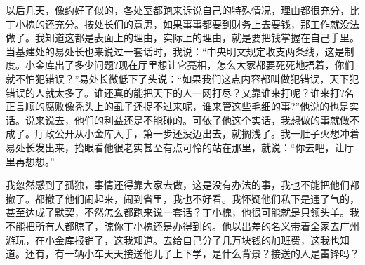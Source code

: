 \documentclass[12pt,oneside]{book}
\begin{document}
以后几天，像约好了似的，各处室都跑来诉说自己的特殊情况，理由都很充分，比丁小槐的还充分。按处长们的意思，如果事事都要到财务上去要钱，那工作就没法做了。我知道这都是表面上的理由，实际上的理由，就是要把钱掌握在自己手里。当基建处的易处长也来说过一套话时，我说：``中央明文规定收支两条线，这是制度。小金库出了多少问题?现在厅里想让它亮相，怎么大家都要死死地捂着，你们就不怕犯错误？''易处长微低下了头说：``如果我们这点内容都叫做犯错误，天下犯错误的人就太多了。谁还真的能把天下的人一网打尽？又靠谁来打呢？谁来打?名正言顺的腐败像秃头上的虱子还捉不过来呢，谁来管这些毛细的事?''他说的也是实话。说来说去，他们的利益还是不能碰的。可依了他这个实话，我想做的事就做不成了。厅政公开从小金库入手，第一步还没迈出去，就搁浅了。我一肚子火想冲着易处长发出来，抬眼看他很老实甚至有点可怜的站在那里，就说：``你去吧，让厅里再想想。''

我忽然感到了孤独，事情还得靠大家去做，这是没有办法的事，我也不能把他们都撤了。都撤了他们闹起来，闹到省里，我也不好看。我怀疑他们私下是通了气的，甚至达成了默契，不然怎么都跑来说一套话？丁小槐，他很可能就是只领头羊。我不能把所有人都晾了，晾你丁小槐还是办得到的。他以出差的名义带着全家去广州游玩，在小金库报销了，这我知道。去给自己分了几万块钱的加班费，这我也知道。还有，有一辆小车天天接送他儿子上下学，是什么背景？接送的人是雷锋吗？
\end{document}
